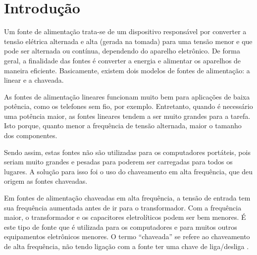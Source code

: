 \documentclass[a4paper,12pt,oneside,openany,table,xcdraw]{article}
\begin{document}
\newcommand{\thedepartment}{Faculdade de Engenharia Elétrica}
\newcommand{\thecourse}{FEELT}
\newcommand{\thetitle}{FONTE DE ALIMENTAÇÃO LINEAR REGULADA + AMPLIFICADOR}
\newcommand{\thetype}{Relatório da Disciplina de Eletrônica Analógica I}
\newcommand{\theproftitle}{Bacharel em Engenharia Elétrica}
\newcommand{\thestudent}{Ana Júlia Costa Santana \_ 
11811ETE003\\Lesly Viviane Montúfar Berrios \_ 
11811ETE001}
\newcommand{\theadvisor}{Prof. Daniel Pereira de Carvalho}
\newcommand{\thecity}{Uberlândia}

\thispagestyle{empty}


\onehalfspacing
\tableofcontents %
\newpage

\section{Introdução}
Um fonte de alimentação
trata-se de um dispositivo responsável por converter a tensão elétrica alternada e alta (gerada na tomada) para uma tensão menor e que pode ser alternada ou contínua, dependendo do aparelho eletrônico.
De forma geral, a finalidade das fontes é converter a energia e alimentar os aparelhos de maneira eficiente.
Basicamente, existem dois modelos de fontes de alimentação: a linear e a chaveada.

As fontes de alimentação lineares funcionam muito bem para aplicações de baixa potência, como os telefones sem fio, por exemplo. Entretanto, quando é necessário uma potência maior, as fontes lineares tendem a ser muito grandes para a tarefa. Isto porque, quanto menor a frequência de tensão alternada, maior o tamanho dos componentes. 

Sendo assim, estas fontes não são utilizadas para os computadores portáteis, pois seriam muito grandes e pesadas para poderem ser carregadas para todos os lugares. A solução para isso foi o uso do chaveamento em alta frequência, que deu origem as fontes chaveadas.

Em fontes de alimentação chaveadas em alta frequência, a tensão de entrada tem sua frequência aumentada antes de ir para o transformador. Com a frequência maior, o transformador e os capacitores eletrolíticos podem ser bem menores. 
É este tipo de fonte que é utilizada para os computadores e para muitos outros equipamentos eletrônicos menores. O termo “chaveada” se refere ao chaveamento de alta frequência, não tendo ligação com a fonte ter uma chave de liga/desliga \cite{hayama}.
\end{document}
